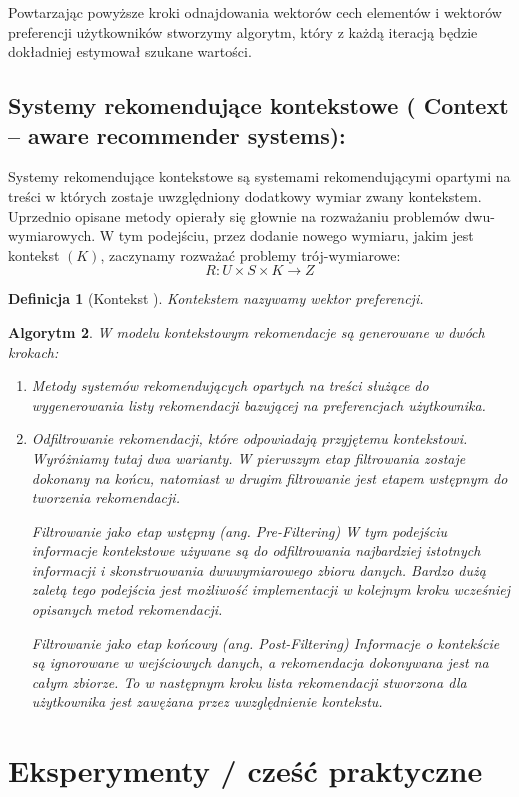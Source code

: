 \documentclass[12pt,a4paper]{report}
\newtheorem{df}{Definicja}[chapter]
\newtheorem{algorytm}[df]{Algorytm}
\begin{document}
Powtarzając powyższe kroki odnajdowania wektorów cech elementów i wektorów preferencji użytkowników stworzymy algorytm, który z każdą iteracją będzie dokładniej estymował szukane wartości.
\section{Systemy rekomendujące kontekstowe ( Context – aware recommender systems):}

Systemy rekomendujące kontekstowe są systemami rekomendującymi opartymi na treści w których zostaje uwzględniony dodatkowy wymiar zwany kontekstem. Uprzednio opisane metody opierały się głownie na rozważaniu problemów dwu-wymiarowych. W tym podejściu, przez dodanie nowego wymiaru, jakim jest kontekst $(K)$, zaczynamy rozważać problemy trój-wymiarowe:
$$
R: U \times S \times K  \rightarrow Z
$$
\begin{df}[Kontekst {\citep[Sec 3.3.1.1]{rsh}}]
Kontekstem nazywamy wektor preferencji.
\end{df}

\begin{algorytm}
W modelu kontekstowym rekomendacje są generowane w dwóch krokach:
\begin{enumerate}
\item Metody systemów rekomendujących opartych na treści służące do wygenerowania listy rekomendacji bazującej na  preferencjach użytkownika.
\item Odfiltrowanie rekomendacji, które odpowiadają przyjętemu kontekstowi.
Wyróżniamy tutaj dwa warianty. W pierwszym etap filtrowania zostaje dokonany na końcu, natomiast w drugim filtrowanie jest etapem wstępnym do tworzenia rekomendacji.


Filtrowanie jako etap wstępny (ang. Pre-Filtering)
W tym podejściu informacje kontekstowe używane są do odfiltrowania najbardziej istotnych informacji i skonstruowania dwuwymiarowego zbioru danych. Bardzo dużą zaletą tego podejścia jest możliwość implementacji w kolejnym kroku wcześniej opisanych metod rekomendacji. 

Filtrowanie jako etap końcowy (ang. Post-Filtering)
Informacje o kontekście są ignorowane w wejściowych danych, a rekomendacja dokonywana jest na całym zbiorze. To w następnym kroku lista rekomendacji stworzona dla użytkownika jest zawężana przez uwzględnienie kontekstu.
\end{enumerate}
\end{algorytm}

\chapter{Eksperymenty / cześć praktyczne}
\end{document}
